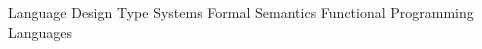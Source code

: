 \begin{cvinterests}

  \cvinterest
    {Language Design}
    {}
  \cvinterest
    {Type Systems}
    {}
  \cvinterest
    {Formal Semantics}
    {}
  \cvinterest
    {Functional Programming Languages}
    {}
\end{cvinterests}
